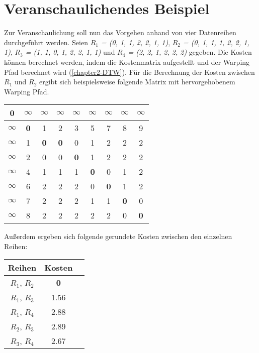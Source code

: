 \section{Veranschaulichendes Beispiel}
\label{chapter2-Example}
Zur Veranschaulichung soll nun das Vorgehen anhand von vier Datenreihen durchgeführt werden.
Seien \emph{$R_{1}$ = (0, 1, 1, 2, 2, 1, 1)}, \emph{$R_{2}$ = (0, 1, 1, 1, 2, 2, 1, 1)}, \emph{$R_{3}$ = (1, 1, 0, 1, 2, 2, 1, 1)}
und \emph{$R_{4}$ = (2, 2, 1, 2, 2, 2)} gegeben.
Die Kosten können berechnet werden, indem die Kostenmatrix aufgestellt und der Warping Pfad berechnet wird (\autoref{chapter2-DTW}).
Für die Berechnung der Kosten zwischen \emph{$R_{1}$} und \emph{$R_{2}$} ergibt sich beispielsweise folgende Matrix
mit hervorgehobenem Warping Pfad.
\begin{center}
    \begin{tabular}{ |c|c|c|c|c|c|c|c|c| } 
     \hline
     \textbf{0} & $\infty$ & $\infty$ & $\infty$ & $\infty$ & $\infty$ & $\infty$ & $\infty$ & $\infty$ \\
     \hline
     $\infty$ &\textbf{0} & 1 & 2 & 3 & 5 & 7 & 8 & 9 \\
     \hline
     $\infty$ & 1 & \textbf{0} & \textbf{0} & 0 & 1 & 2 & 2 & 2 \\
     \hline
     $\infty$ & 2 & 0 & 0 & \textbf{0} & 1 & 2 & 2 & 2 \\
     \hline
     $\infty$ & 4 & 1 & 1 & 1 & \textbf{0} & 0 & 1 & 2 \\
     \hline
     $\infty$ & 6 & 2 & 2 & 2 & 0 & \textbf{0} & 1 & 2 \\
     \hline
     $\infty$ & 7 & 2 & 2 & 2 & 1 & 1 & \textbf{0} & 0 \\
     \hline
     $\infty$ & 8 & 2 & 2 & 2 & 2 & 2 & 0 & \textbf{0} \\
     \hline
    \end{tabular}
\end{center}
Außerdem ergeben sich folgende gerundete Kosten zwischen den einzelnen Reihen: 
\begin{center}
    \begin{tabular}{ |c|c|c| } 
     \hline
     Reihen & Kosten \\
     \hline \hline
     $R_{1}$, $R_{2}$ & \textbf{0} \\
     \hline
     $R_{1}$, $R_{3}$ & 1.56 \\
     \hline
     $R_{1}$, $R_{4}$ & 2.88 \\
     \hline
     $R_{2}$, $R_{3}$ & 2.89 \\
     \hline
     $R_{3}$, $R_{4}$ & 2.67 \\
     \hline
    \end{tabular}
\end{center}
